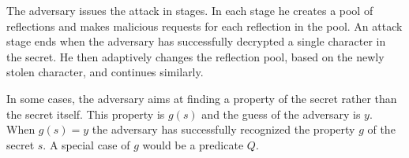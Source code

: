 The adversary issues the attack in stages. In each stage he creates a pool of
reflections and makes malicious requests for each reflection in the pool. An
attack stage ends when the adversary has successfully decrypted a single
character in the secret. He then adaptively changes the reflection pool, based
on the newly stolen character, and continues similarly.

In some cases, the adversary aims at finding a property of the secret rather
than the secret itself. This property is $g(s)$ and the guess of the adversary
is $y$. When $g(s) = y$ the adversary has successfully recognized the property
$g$ of the secret $s$. A special case of $g$ would be a predicate $Q$.
